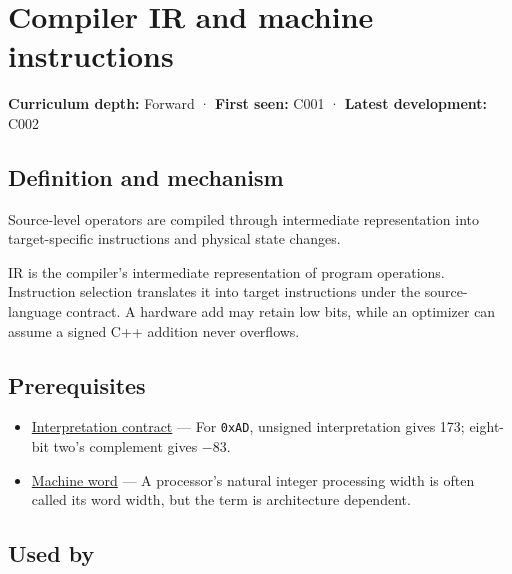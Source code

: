 \hypertarget{appendix-942ad41afb30}{}\label{referencestart:appendix-942ad41afb30}
\section{Compiler IR and machine instructions}\label{appendix-942ad41afb30-compiler-ir-and-machine-instructions}

\textbf{Curriculum depth:} Forward · \textbf{First seen:} C001 · \textbf{Latest development:} C002

\begin{allmightroledefinition}

\subsection{Definition and mechanism}\label{appendix-942ad41afb30-definition-and-mechanism}

Source-level operators are compiled through intermediate representation into target-specific instructions and physical state changes.

\end{allmightroledefinition}

IR is the compiler's intermediate representation of program operations. Instruction selection translates it into target instructions under the source-language contract. A hardware add may retain low bits, while an optimizer can assume a signed C++ addition never overflows.

\subsection{Prerequisites}\label{appendix-942ad41afb30-prerequisites}

\begin{itemize}
\tightlist
\item
  \hyperref[appendix-f414bd4ed05c]{Interpretation contract} --- For \texttt{0xAD}, unsigned interpretation gives 173; eight-bit two's complement gives −83.
\item
  \hyperref[appendix-d67a19507dc5]{Machine word} --- A processor's natural integer processing width is often called its word width, but the term is architecture dependent.
\end{itemize}

\subsection{Used by}\label{appendix-942ad41afb30-used-by}

